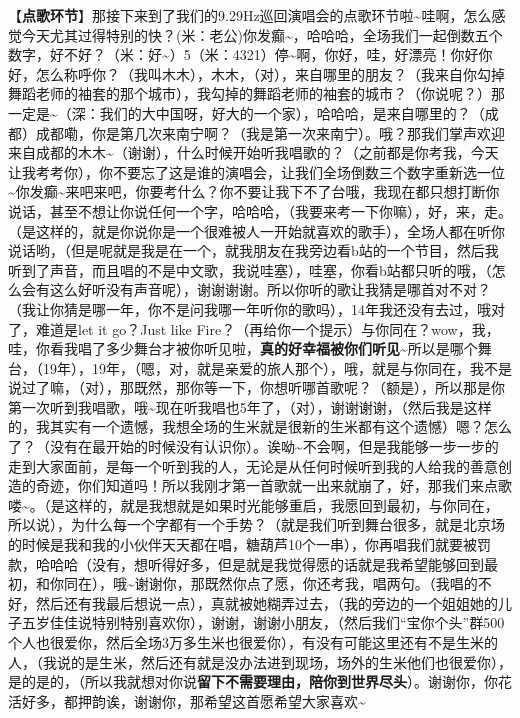 \documentclass[]{ctexbook}
\begin{document}
【\textbf{点歌环节}】那接下来到了我们的9.29Hz巡回演唱会的点歌环节啦\textasciitilde 哇啊，怎么感觉今天尤其过得特别的快？(米：老公)你发癫\textasciitilde，哈哈哈，全场我们一起倒数五个数字，好不好？（米：好\textasciitilde）5（米：4321）停\textasciitilde 啊，你好，哇，好漂亮！你好你好，怎么称呼你？（我叫木木），木木，（对），来自哪里的朋友？（我来自你勾掉舞蹈老师的袖套的那个城市），我勾掉的舞蹈老师的袖套的城市？（你说呢？）那一定是\textasciitilde（深：我们的大中国呀，好大的一个家），哈哈哈，是来自哪里的？（成都）成都嘞，你是第几次来南宁啊？（我是第一次来南宁）。哦？那我们掌声欢迎来自成都的木木\textasciitilde（谢谢），什么时候开始听我唱歌的？（之前都是你考我，今天让我考考你），你不要忘了这是谁的演唱会，让我们全场倒数三个数字重新选一位\textasciitilde 你发癫\textasciitilde 来吧来吧，你要考什么？你不要让我下不了台哦，我现在都只想打断你说话，甚至不想让你说任何一个字，哈哈哈，（我要来考一下你嘛），好，来，走。（是这样的，就是你说你是一个很难被人一开始就喜欢的歌手），全场人都在听你说话哟，（但是呢就是我是在一个，就我朋友在我旁边看b站的一个节目，然后我听到了声音，而且唱的不是中文歌，我说哇塞），哇塞，你看b站都只听的哦，（怎么会有这么好听没有声音呢），谢谢谢谢。所以你听的歌让我猜是哪首对不对？（我让你猜是哪一年，你不是问我哪一年听你的歌吗），14年我还没有去过，哦对了，难道是let it go？Just like Fire？（再给你一个提示）与你同在？wow，我，哇，你看我唱了多少舞台才被你听见啦，\textbf{真的好幸福被你们听见\textasciitilde{}}所以是哪个舞台，（19年），19年，（嗯，对，就是亲爱的旅人那个），哦，就是与你同在，我不是说过了嘛，（对），那既然，那你等一下，你想听哪首歌呢？（额是），所以那是你第一次听到我唱歌，哦\textasciitilde 现在听我唱也5年了，（对），谢谢谢谢，（然后我是这样的，我其实有一个遗憾，我想全场的生米就是很新的生米都有这个遗憾）嗯？怎么了？（没有在最开始的时候没有认识你）。诶呦\textasciitilde 不会啊，但是我能够一步一步的走到大家面前，是每一个听到我的人，无论是从任何时候听到我的人给我的善意创造的奇迹，你们知道吗！所以我刚才第一首歌就一出来就崩了，好，那我们来点歌喽\textasciitilde。（是这样的，就是我想就是如果时光能够重启，我愿回到最初，与你同在，所以说），为什么每一个字都有一个手势？（就是我们听到舞台很多，就是北京场的时候是我和我的小伙伴天天都在唱，糖葫芦10个一串），你再唱我们就要被罚款，哈哈哈（没有，想听得好多，但是就是我觉得愿的话就是我希望能够回到最初，和你同在），哦\textasciitilde 谢谢你，那既然你点了愿，你还考我，唱两句。（我唱的不好，然后还有我最后想说一点），真就被她糊弄过去，（我的旁边的一个姐姐她的儿子五岁佳佳说特别特别喜欢你），谢谢，谢谢小朋友，（然后我们``宝你个头''群500个人也很爱你，然后全场3万多生米也很爱你），有没有可能这里还有不是生米的人，（我说的是生米，然后还有就是没办法进到现场，场外的生米他们也很爱你），是的是的，（所以我就想对你说\textbf{留下不需要理由，陪你到世界尽头}）。谢谢你，你花活好多，都押韵诶，谢谢你，那希望这首愿希望大家喜欢\textasciitilde{}
\end{document}
